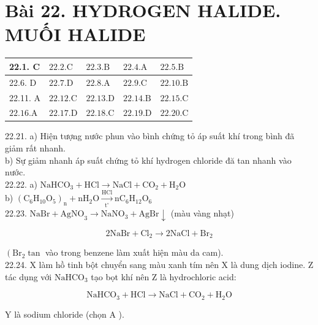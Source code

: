 \documentclass[10pt]{article}
\begin{document}
\section*{Bài 22. HYDROGEN HALIDE. MUỐI HALIDE}
\begin{center}
\begin{tabular}{|l|l|l|l|l|}
\hline
22.1. C & $22.2 . \mathrm{C}$ & $22.3 . \mathrm{B}$ & $22.4 . \mathrm{A}$ & $22.5 . \mathrm{B}$ \\
\hline
22.6. D & $22.7 . \mathrm{D}$ & $22.8 . \mathrm{A}$ & $22.9 . \mathrm{C}$ & $22.10 . \mathrm{B}$ \\
\hline
22.11. A & $22.12 . \mathrm{C}$ & $22.13 . \mathrm{D}$ & $22.14 . \mathrm{B}$ & $22.15 . \mathrm{C}$ \\
\hline
$22.16 . \mathrm{A}$ & $22.17 . \mathrm{D}$ & $22.18 . \mathrm{C}$ & $22.19 . \mathrm{D}$ & $22.20 . \mathrm{C}$ \\
\hline
\end{tabular}
\end{center}

22.21. a) Hiện tượng nước phun vào bình chứng tỏ áp suất khí trong bình đã giảm rất nhanh.\\
b) Sự giảm nhanh áp suất chứng tỏ khí hydrogen chloride đă tan nhanh vào nước.\\
22.22. a) $\mathrm{NaHCO}_{3}+\mathrm{HCl} \longrightarrow \mathrm{NaCl}+\mathrm{CO}_{2}+\mathrm{H}_{2} \mathrm{O}$\\
b) $\left(\mathrm{C}_{6} \mathrm{H}_{10} \mathrm{O}_{5}\right)_{\mathrm{n}}+\mathrm{nH}_{2} \mathrm{O} \xrightarrow[\mathrm{t}^{\circ}]{\mathrm{HCl}} \mathrm{nC}_{6} \mathrm{H}_{12} \mathrm{O}_{6}$\\
22.23. $\mathrm{NaBr}+\mathrm{AgNO}_{3} \longrightarrow \mathrm{NaNO}_{3}+\mathrm{AgBr} \downarrow$ (màu vàng nhạt)

$$
2 \mathrm{NaBr}+\mathrm{Cl}_{2} \longrightarrow 2 \mathrm{NaCl}+\mathrm{Br}_{2}
$$

$\left(\mathrm{Br}_{2} \tan\right.$ vào trong benzene làm xuất hiện màu da cam).\\
22.24. X làm hồ tinh bột chuyển sang màu xanh tím nên X là dung dịch iodine. Z tác dụng với $\mathrm{NaHCO}_{3}$ tạo bọt khí nên Z là hydrochloric acid:

$$
\mathrm{NaHCO}_{3}+\mathrm{HCl} \longrightarrow \mathrm{NaCl}+\mathrm{CO}_{2}+\mathrm{H}_{2} \mathrm{O}
$$

Y là sodium chloride (chọn A ).
\end{document}
